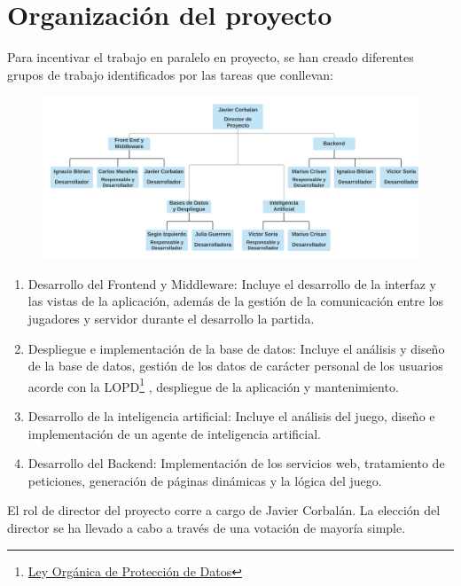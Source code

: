 \section{Organización del proyecto}
\label{organiz}

Para incentivar el trabajo en paralelo en proyecto, se han creado diferentes grupos de trabajo identificados por las tareas que conllevan:

\begin{figure}[h]
	\centering \includegraphics[scale=0.6]{figuras/organigrama.png}
\end{figure}


\begin{enumerate}
\item Desarrollo del Frontend y Middleware: Incluye el desarrollo de la interfaz y las vistas de la aplicación, además de la gestión de la comunicación entre los jugadores y servidor durante el desarrollo la partida.
	
\newpage
\item Despliegue e implementación de la base de datos: Incluye el análisis y diseño de la base de datos, gestión de los datos de carácter personal de los usuarios acorde con la LOPD\footnote{\href{http://www.agpd.es/portalwebAGPD/canaldocumentacion/informes_juridicos/reglamento_lopd/index-ides-idphp.php}{Ley Orgánica de Protección de Datos}} , despliegue de la aplicación y mantenimiento.

\item Desarrollo de la inteligencia artificial: Incluye el análisis del juego, diseño e implementación de un agente de inteligencia artificial.

\item Desarrollo del Backend: Implementación de los servicios web, tratamiento de peticiones, generación de páginas dinámicas y la lógica del juego.

\end{enumerate}

El rol de director del proyecto corre a cargo de Javier Corbalán. La elección del director se ha llevado a cabo a través de una votación de mayoría simple.

